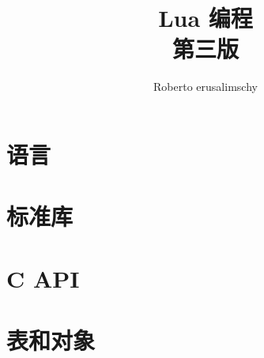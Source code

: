 \documentclass{ctexbook}
\begin{document}
    \title{Lua 编程\\第三版}
    \author{Roberto erusalimschy}
    \maketitle
    \tableofcontents
    \frontmatter
    
    \mainmatter
    \part{语言}
    
    
    \part{标准库}
    \part{C API}
    \part{表和对象}
    \appendix
    \backmatter
    
\end{document}
